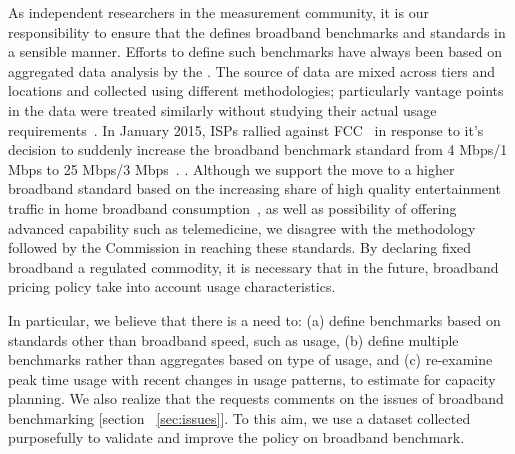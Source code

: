 As independent researchers in the measurement community, it is our responsibility to ensure that the
\FCC defines broadband benchmarks and standards in a sensible manner. Efforts to define such
benchmarks have always been based on aggregated data analysis by the \FCC. The source of data are
mixed across tiers and locations and collected using different methodologies; particularly vantage
points in the data were treated similarly without studying their actual usage
requirements~\cite{report2010-2014}.  In January 2015, ISPs rallied against FCC~\cite{fcc-redefine-ieee} in response to
it’s decision to suddenly increase the broadband benchmark standard from 4 Mbps/1 Mbps to 25 Mbps/3
Mbps~\cite{}. . Although we support the move to a higher broadband
standard based on the increasing share of high quality entertainment traffic in home broadband
consumption~\cite{sandvine2014report1,sandvine2014report2}, as well as possibility of offering
advanced capability such as telemedicine, we disagree with the methodology followed by the
Commission in reaching these standards. By declaring fixed broadband a regulated commodity, it is
necessary that in the future, broadband pricing policy take into account usage characteristics.

In particular, we believe that there is a need to: (a) define benchmarks based on standards other
than broadband speed, such as usage, (b) define multiple benchmarks rather than aggregates based on
type of usage, and (c) re-examine peak time usage with recent changes in usage patterns, to estimate
for capacity planning. We also realize that the \FCC requests comments on the issues of broadband
benchmarking [section ~\ref{sec:issues}]. To this aim, we use a dataset collected purposefully to
validate and improve the \FCC policy on broadband benchmark.


